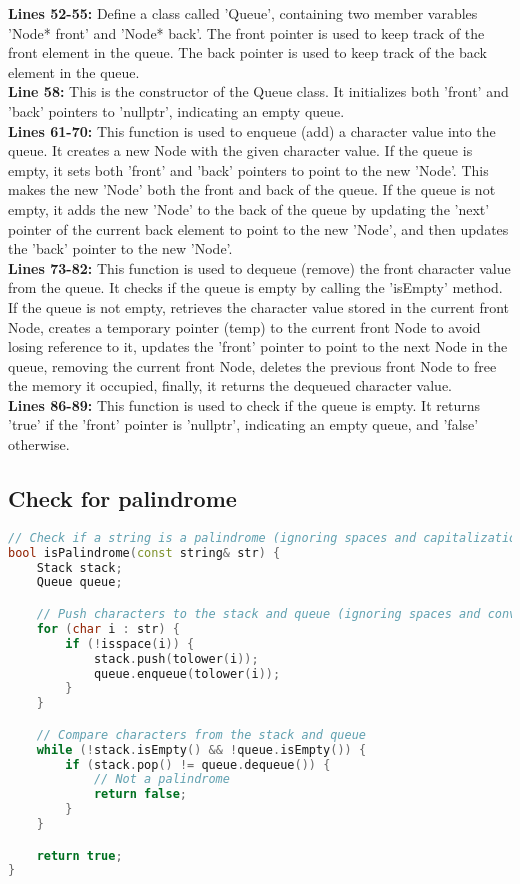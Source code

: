 \documentclass[letterpaper, 10pt,DIV=13]{scrartcl}
\numberwithin{equation}{section} %
\numberwithin{figure}{section} %
\numberwithin{table}{section} %
\begin{document}
\textbf{Lines 52-55:} Define a class called 'Queue', containing two member varables 'Node* front' and 'Node* back'. The front pointer is used to keep track of the front element in the queue. The back pointer is used to keep track of the back element in the queue. \\
\textbf{Line 58:} This is the constructor of the Queue class. It initializes both 'front' and 'back' pointers to 'nullptr', indicating an empty queue. \\
\textbf{Lines 61-70:} This function is used to enqueue (add) a character value into the queue. It creates a new Node with the given character value. If the queue is empty, it sets both 'front' and 'back' pointers to point to the new 'Node'. This makes the new 'Node' both the front and back of the queue. If the queue is not empty, it adds the new 'Node' to the back of the queue by updating the 'next' pointer of the current back element to point to the new 'Node', and then updates the 'back' pointer to the new 'Node'. \\
\textbf{Lines 73-82:} This function is used to dequeue (remove) the front character value from the queue. It checks if the queue is empty by calling the 'isEmpty' method. If the queue is not empty, retrieves the character value stored in the current front Node, creates a temporary pointer (temp) to the current front Node to avoid losing reference to it, updates the 'front' pointer to point to the next Node in the queue, removing the current front Node, deletes the previous front Node to free the memory it occupied, finally, it returns the dequeued character value. \\
\textbf{Lines 86-89:} This function is used to check if the queue is empty. It returns 'true' if the 'front' pointer is 'nullptr', indicating an empty queue, and 'false' otherwise.

\subsection{Check for palindrome}
\begin{linenumbers}
\begin{lstlisting}[language=C++, caption={Check for Palindrome}, label={code:example}]
// Check if a string is a palindrome (ignoring spaces and capitalization)
bool isPalindrome(const string& str) {
    Stack stack;
    Queue queue;

    // Push characters to the stack and queue (ignoring spaces and converting to lowercase)
    for (char i : str) {
        if (!isspace(i)) {
            stack.push(tolower(i));
            queue.enqueue(tolower(i));
        }
    }

    // Compare characters from the stack and queue
    while (!stack.isEmpty() && !queue.isEmpty()) {
        if (stack.pop() != queue.dequeue()) {
            // Not a palindrome
            return false;
        }
    }

    return true;
}
\end{lstlisting}
\end{linenumbers}
\nolinenumbers
\end{document}
